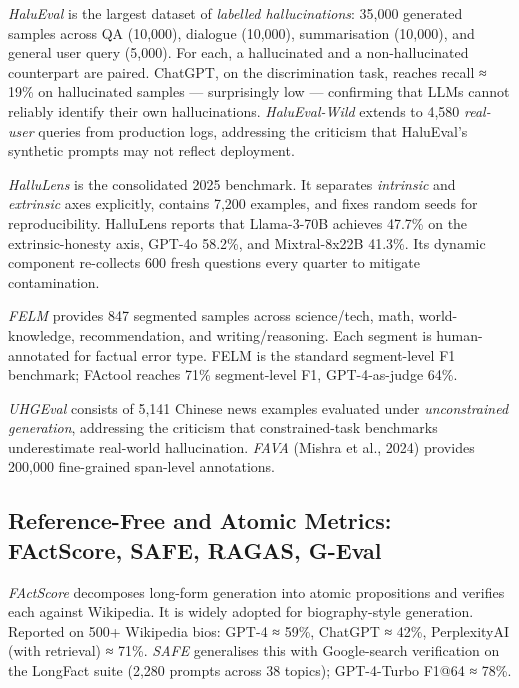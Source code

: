 \documentclass{article}
\begin{document}
\emph{HaluEval} \citep{li2023haluevalalargescal} is the largest dataset of \emph{labelled hallucinations}: 35,000 generated samples across QA (10,000), dialogue (10,000), summarisation (10,000), and general user query (5,000). For each, a hallucinated and a non-hallucinated counterpart are paired. ChatGPT, on the discrimination task, reaches recall ≈ 19\% on hallucinated samples --- surprisingly low --- confirming that LLMs cannot reliably identify their own hallucinations. \emph{HaluEval-Wild} \citep{zhu2024haluevalwildevalua} extends to 4,580 \emph{real-user} queries from production logs, addressing the criticism that HaluEval's synthetic prompts may not reflect deployment.

\emph{HalluLens} \citep{bang2025hallulensllmhalluc} is the consolidated 2025 benchmark. It separates \emph{intrinsic} and \emph{extrinsic} axes explicitly, contains 7,200 examples, and fixes random seeds for reproducibility. HalluLens reports that Llama-3-70B achieves 47.7\% on the extrinsic-honesty axis, GPT-4o 58.2\%, and Mixtral-8x22B 41.3\%. Its dynamic component re-collects 600 fresh questions every quarter to mitigate contamination.

\emph{FELM} \citep{chen2023felmbenchmarkingfa} provides 847 segmented samples across science/tech, math, world-knowledge, recommendation, and writing/reasoning. Each segment is human-annotated for factual error type. FELM is the standard segment-level F1 benchmark; FActool reaches 71\% segment-level F1, GPT-4-as-judge 64\%.

\emph{UHGEval} \citep{liang2024uhgevalbenchmarkin} consists of 5,141 Chinese news examples evaluated under \emph{unconstrained generation}, addressing the criticism that constrained-task benchmarks underestimate real-world hallucination. \emph{FAVA} (Mishra et al., 2024) provides 200,000 fine-grained span-level annotations.

\subsection{Reference-Free and Atomic Metrics: FActScore, SAFE, RAGAS, G-Eval}\label{reference-free-and-atomic-metrics-factscore-safe-ragas-g-eval}

\emph{FActScore} \citep{min2023factscorefinegrain} decomposes long-form generation into atomic propositions and verifies each against Wikipedia. It is widely adopted for biography-style generation. Reported on 500+ Wikipedia bios: GPT-4 ≈ 59\%, ChatGPT ≈ 42\%, PerplexityAI (with retrieval) ≈ 71\%. \emph{SAFE} \citep{wei2024longformfactuality} generalises this with Google-search verification on the LongFact suite (2,280 prompts across 38 topics); GPT-4-Turbo F1@64 ≈ 78\%.
\end{document}
